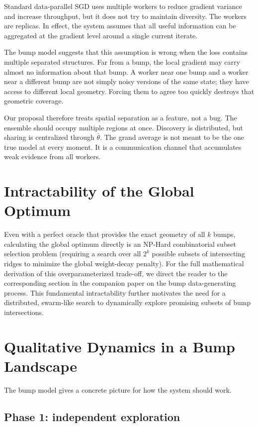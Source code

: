 \documentclass{article}
\begin{document}
Standard data-parallel SGD uses multiple workers to reduce gradient
variance and increase throughput, but it does not try to maintain
diversity. The workers are replicas. In effect, the system assumes that
all useful information can be aggregated at the gradient level around a
single current iterate.

The bump model suggests that this assumption is wrong when the loss
contains multiple separated structures. Far from a bump, the local
gradient may carry almost no information about that bump. A worker near
one bump and a worker near a different bump are not simply noisy
versions of the same state; they have access to different local
geometry. Forcing them to agree too quickly destroys that geometric
coverage.

Our proposal therefore treats spatial separation as a feature, not a
bug. The ensemble should occupy multiple regions at once. Discovery is
distributed, but sharing is centralized through $\bar{\theta}$. The
grand average is not meant to be the one true model at every moment. It
is a communication channel that accumulates weak evidence from all
workers.

\section{Intractability of the Global Optimum}

Even with a perfect oracle that provides the exact geometry of all $k$ bumps, calculating the global optimum directly is an NP-Hard combinatorial subset selection problem (requiring a search over all $2^k$ possible subsets of intersecting ridges to minimize the global weight-decay penalty). For the full mathematical derivation of this overparameterized trade-off, we direct the reader to the corresponding section in the companion paper on the bump data-generating process. This fundamental intractability further motivates the need for a distributed, swarm-like search to dynamically explore promising subsets of bump intersections.

\section{Qualitative Dynamics in a Bump Landscape}

The bump model gives a concrete picture for how the system should work.

\subsection*{Phase 1: independent exploration}
\end{document}
